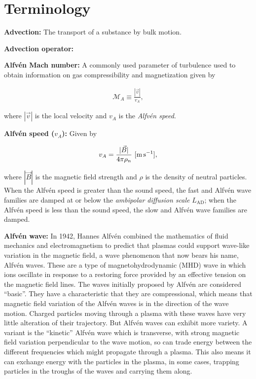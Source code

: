 \documentclass[a4paper,10pt]{article}
\begin{document}

\newpage
\section{Terminology}

{\noindent}\textbf{Advection:} The transport of a substance by bulk motion.

{\noindent}\textbf{Advection operator:}

{\noindent}\textbf{Alfv\'en Mach number:} A commonly used parameter of turbulence used to obtain information on gas compressibility and magnetization given by

\begin{align*}
    \mathcal{M}_A \equiv \frac{|\vec{v}|}{v_A},
\end{align*}

{\noindent}where $|\vec{v}|$ is the local velocity and $v_A$ is the \textit{Alfv\'en speed}.

{\noindent}\textbf{Alfv\'en speed ($v_A$):} Given by

\begin{align*}
    v_A = \frac{|\vec{B}|}{4\pi\rho_n} ~ [{\rm m\,s^{-1}}],
\end{align*}

{\noindent}where $|\vec{B}|$ is the magnetic field strength and $\rho$ is the density of neutral particles. When the Alfv\'en speed is greater than the sound speed, the fast and Alfv\'en wave families are damped at or below the \textit{ambipolar diffusion scale} $L_\mathrm{AD}$; when the Alfv\'en speed is less than the sound speed, the slow and Alfv\'en wave families are damped.

{\noindent}\textbf{Alfv\'en wave:} In 1942, Hannes Alfv\'en combined the mathematics of fluid mechanics and electromagnetism to predict that plasmas could support wave-like variation in the magnetic field, a wave phenomenon that now bears his name, Alfv\'en waves. These are a type of magnetohydrodynamic (MHD) wave in which ions oscillate in response to a restoring force provided by an effective tension on the magnetic field lines. The waves initially proposed by Alfv\'en are considered ``basic''. They have a characteristic that they are compressional, which means that magnetic field variation of the Alfv\'en waves is in the direction of the wave motion. Charged particles moving through a plasma with these waves have very little alteration of their trajectory. But Alfv\'en waves can exhibit more variety. A variant is the ``kinetic'' Alfv\'en wave which is transverse, with strong magnetic field variation perpendicular to the wave motion, so can trade energy between the different frequencies which might propagate through a plasma. This also means it can exchange energy with the particles in the plasma, in some cases, trapping particles in the troughs of the waves and carrying them along.
\end{document}
